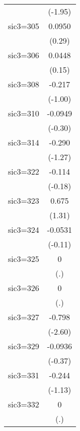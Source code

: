 \begin{table}[htbp]
\begin{tabular*}{0.8\hsize}{@{\hskip\tabcolsep\extracolsep\fill}l*{1}{c}}
                    &     (-1.95)         \\
\addlinespace
sic3=305            &      0.0950         \\
                    &      (0.29)         \\
\addlinespace
sic3=306            &      0.0448         \\
                    &      (0.15)         \\
\addlinespace
sic3=308            &      -0.217         \\
                    &     (-1.00)         \\
\addlinespace
sic3=310            &     -0.0949         \\
                    &     (-0.30)         \\
\addlinespace
sic3=314            &      -0.290         \\
                    &     (-1.27)         \\
\addlinespace
sic3=322            &      -0.114         \\
                    &     (-0.18)         \\
\addlinespace
sic3=323            &       0.675         \\
                    &      (1.31)         \\
\addlinespace
sic3=324            &     -0.0531         \\
                    &     (-0.11)         \\
\addlinespace
sic3=325            &           0         \\
                    &         (.)         \\
\addlinespace
sic3=326            &           0         \\
                    &         (.)         \\
\addlinespace
sic3=327            &      -0.798\sym{**} \\
                    &     (-2.60)         \\
\addlinespace
sic3=329            &     -0.0936         \\
                    &     (-0.37)         \\
\addlinespace
sic3=331            &      -0.244         \\
                    &     (-1.13)         \\
\addlinespace
sic3=332            &           0         \\
                    &         (.)         \\

\end{tabular*}
\end{table}
